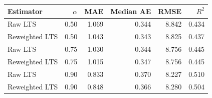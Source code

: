 \begin{tabular}{lrrrrr}
\toprule
Estimator & $\alpha$ & MAE & Median AE & RMSE & $R^2$ \\
\midrule
Raw LTS & 0.50 & 1.069 & 0.344 & 8.842 & 0.434 \\
Reweighted LTS & 0.50 & 1.043 & 0.343 & 8.825 & 0.437 \\
Raw LTS & 0.75 & 1.030 & 0.344 & 8.756 & 0.445 \\
Reweighted LTS & 0.75 & 1.015 & 0.347 & 8.756 & 0.445 \\
Raw LTS & 0.90 & 0.833 & 0.370 & 8.227 & 0.510 \\
Reweighted LTS & 0.90 & 0.848 & 0.366 & 8.280 & 0.504 \\
\bottomrule
\end{tabular}
